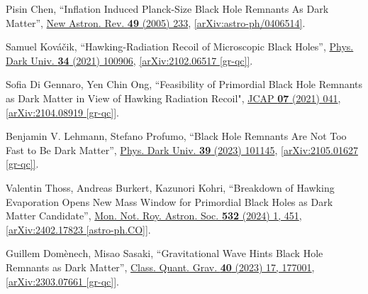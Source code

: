 \documentclass[12pt,preprintnumbers, floatfix, preprintnumbers, letterpaper, superscriptaddress,nofootinbib]{revtex4-2}
\begin{document}
\begin{thebibliography}{99}
Pisin Chen, ``Inflation Induced Planck-Size Black Hole Remnants As Dark Matter'', {\href{https://www.sciencedirect.com/science/article/abs/pii/S1387647305000333?via\%3Dihub}{New Astron. Rev. \textbf{49} (2005) 233}}, \href{https://arxiv.org/abs/astro-ph/0406514}{[arXiv:astro-ph/0406514]}.

Samuel Kováčik, ``Hawking-Radiation Recoil of Microscopic Black Holes'', {\href{https://www.sciencedirect.com/science/article/abs/pii/S2212686421001333?via\%3Dihub}{Phys. Dark Univ. \textbf{34} (2021) 100906}}, \href{https://arxiv.org/abs/2102.06517}{[arXiv:2102.06517 [gr-qc]]}.

Sofia Di Gennaro, Yen Chin Ong, ``Feasibility of Primordial Black Hole Remnants as Dark Matter in View of Hawking Radiation Recoil",  {\href{https://iopscience.iop.org/article/10.1088/1475-7516/2021/07/041}{JCAP \textbf{07} (2021) 041}}, \href{https://arxiv.org/abs/2104.08919}{[arXiv:2104.08919 [gr-qc]]}.

Benjamin V. Lehmann, Stefano Profumo, ``Black Hole Remnants Are Not Too Fast to Be Dark Matter'', {\href{https://www.sciencedirect.com/science/article/pii/S2212686422001182?via\%3Dihub}{Phys. Dark Univ. \textbf{39} (2023) 101145}}, \href{https://arxiv.org/abs/2105.01627}{[arXiv:2105.01627 [gr-qc]]}.

Valentin Thoss, Andreas Burkert, Kazunori Kohri, ``Breakdown of Hawking Evaporation Opens New Mass Window for Primordial Black Holes as Dark Matter Candidate'', {\href{https://academic.oup.com/mnras/article/532/1/451/7656972}{Mon. Not. Roy. Astron. Soc. \textbf{532} (2024) 1, 451}}, \href{https://arxiv.org/abs/2402.17823}{[arXiv:2402.17823 [astro-ph.CO]]}.

Guillem Domènech, Misao Sasaki, ``Gravitational Wave Hints Black Hole Remnants as Dark Matter'',  {\href{https://iopscience.iop.org/article/10.1088/1361-6382/ace493}{Class. Quant. Grav. \textbf{40} (2023) 17, 177001}}, \href{https://arxiv.org/abs/2303.07661}{[arXiv:2303.07661 [gr-qc]]}.

\end{thebibliography}
\end{document}
